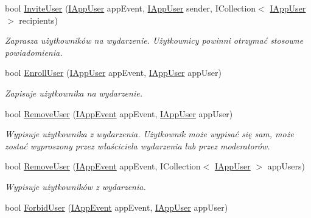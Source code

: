 \begin{DoxyCompactItemize}
bool \hyperlink{class_bibabook_1_1_implementation_1_1_app_event_service_1_1_events_service_ab44fc0ac1b5abc5c1544943ebab32c80}{Invite\+User} (\hyperlink{interface_contract_1_1_i_app_user}{I\+App\+User} app\+Event, \hyperlink{interface_contract_1_1_i_app_user}{I\+App\+User} sender, I\+Collection$<$ \hyperlink{interface_contract_1_1_i_app_user}{I\+App\+User} $>$ recipients)
\begin{DoxyCompactList}\small\item\em Zaprasza użytkowników na wydarzenie. Użytkownicy powinni otrzymać stosowne powiadomienia. \end{DoxyCompactList}\item 
bool \hyperlink{class_bibabook_1_1_implementation_1_1_app_event_service_1_1_events_service_a1eb61bcaade404a395c9b79ac9fa17e4}{Enroll\+User} (\hyperlink{interface_contract_1_1_i_app_user}{I\+App\+User} app\+Event, \hyperlink{interface_contract_1_1_i_app_user}{I\+App\+User} app\+User)
\begin{DoxyCompactList}\small\item\em Zapisuje użytkownika na wydarzenie. \end{DoxyCompactList}\item 
bool \hyperlink{class_bibabook_1_1_implementation_1_1_app_event_service_1_1_events_service_a640cf9c1a0dee37f7b320eded34d129d}{Remove\+User} (\hyperlink{interface_contract_1_1_i_app_event}{I\+App\+Event} app\+Event, \hyperlink{interface_contract_1_1_i_app_user}{I\+App\+User} app\+User)
\begin{DoxyCompactList}\small\item\em Wypisuje użytkownika z wydarzenia. Użytkownik może wypisać się sam, może zostać wyproszony przez właściciela wydarzenia lub przez moderatorów. \end{DoxyCompactList}\item 
bool \hyperlink{class_bibabook_1_1_implementation_1_1_app_event_service_1_1_events_service_a425edae1da002dcceeebd6bf65c316b0}{Remove\+User} (\hyperlink{interface_contract_1_1_i_app_event}{I\+App\+Event} app\+Event, I\+Collection$<$ \hyperlink{interface_contract_1_1_i_app_user}{I\+App\+User} $>$ app\+Users)
\begin{DoxyCompactList}\small\item\em Wypisuje użytkowników z wydarzenia. \end{DoxyCompactList}\item 
bool \hyperlink{class_bibabook_1_1_implementation_1_1_app_event_service_1_1_events_service_ab23587341dc178c31d1270ea2dc70a65}{Forbid\+User} (\hyperlink{interface_contract_1_1_i_app_event}{I\+App\+Event} app\+Event, \hyperlink{interface_contract_1_1_i_app_user}{I\+App\+User} app\+User)

\end{DoxyCompactItemize}
